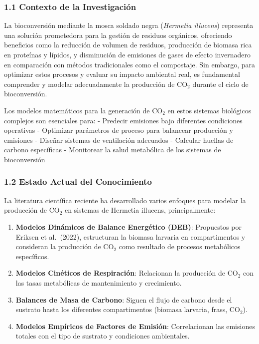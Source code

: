 \documentclass[
]{article}
\begin{document}
\subsubsection{1.1 Contexto de la
Investigación}\label{contexto-de-la-investigaciuxf3n}

La bioconversión mediante la mosca soldado negra (\emph{Hermetia
illucens}) representa una solución prometedora para la gestión de
residuos orgánicos, ofreciendo beneficios como la reducción de volumen
de residuos, producción de biomasa rica en proteínas y lípidos, y
disminución de emisiones de gases de efecto invernadero en comparación
con métodos tradicionales como el compostaje. Sin embargo, para
optimizar estos procesos y evaluar su impacto ambiental real, es
fundamental comprender y modelar adecuadamente la producción de CO$_2$
durante el ciclo de bioconversión.

Los modelos matemáticos para la generación de CO$_2$ en estos sistemas
biológicos complejos son esenciales para: - Predecir emisiones bajo
diferentes condiciones operativas - Optimizar parámetros de proceso para
balancear producción y emisiones - Diseñar sistemas de ventilación
adecuados - Calcular huellas de carbono específicas - Monitorear la
salud metabólica de los sistemas de bioconversión

\subsubsection{1.2 Estado Actual del
Conocimiento}\label{estado-actual-del-conocimiento}

La literatura científica reciente ha desarrollado varios enfoques para
modelar la producción de CO$_2$ en sistemas de Hermetia illucens,
principalmente:

\begin{enumerate}
\def\labelenumi{\arabic{enumi}.}
\item
  \textbf{Modelos Dinámicos de Balance Energético (DEB)}: Propuestos por
  Eriksen et al.~(2022), estructuran la biomasa larvaria en
  compartimentos y consideran la producción de CO$_2$ como resultado de
  procesos metabólicos específicos.
\item
  \textbf{Modelos Cinéticos de Respiración}: Relacionan la producción de
  CO$_2$ con las tasas metabólicas de mantenimiento y crecimiento.
\item
  \textbf{Balances de Masa de Carbono}: Siguen el flujo de carbono desde
  el sustrato hasta los diferentes compartimentos (biomasa larvaria,
  frass, CO$_2$).
\item
  \textbf{Modelos Empíricos de Factores de Emisión}: Correlacionan las
  emisiones totales con el tipo de sustrato y condiciones ambientales.
\end{enumerate}
\end{document}
